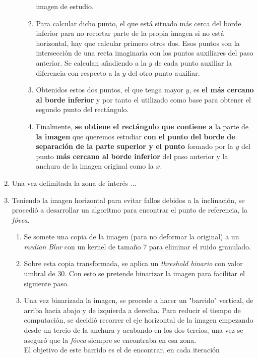 \begin{enumerate}
\begin{enumerate}[label*=\arabic*.]
\begin{enumerate}[label*=\arabic*.]
      imagen de estudio.
    \item Para calcular dicho punto, el que está situado más cerca del
      borde inferior para no recortar parte de la propia imagen si no
      está horizontal, hay que calcular primero otros dos. Esos puntos
      son la intersección de una recta imaginaria con los puntos
      auxiliares del paso anterior. Se calculan añadiendo a la $y$ de
      cada punto auxiliar la diferencia con respecto a la $y$ del otro
      punto auxiliar.
    \item Obtenidos estos dos puntos, el que tenga mayor $y$, es
      \textbf{el más cercano al borde inferior} y por tanto el
      utilizado como base para obtener el segundo punto del
      rectángulo.
    \item Finalmente, \textbf{se obtiene el rectángulo que contiene a}
      la parte de \textbf{la imagen} que queremos estudiar \textbf{con
        el punto del borde de separación de la parte superior y el
        punto} formado por la $y$ del punto \textbf{más cercano al
        borde inferior} del paso anterior y la anchura de la imagen
      original como la $x$.
    \end{enumerate}
  \end{enumerate}
\item Una vez delimitada la zona de interés ... %
\item Teniendo la imagen horizontal para evitar fallos debidos a la 
  inclinación, se procedió a desarrollar un algoritmo para encontrar 
  el punto de referencia, la \emph{fóvea}.
  \begin{enumerate}[label*=\arabic*.] 
  \item Se somete una copia de la imagen (para no deformar la original)
    a un \emph{median Blur} con un kernel de tamaño 7 para eliminar 
    el ruido granulado.
  \item Sobre esta copia transformada, se aplica un 
    \emph{threshold binario} con valor umbral de 30. Con esto se 
    pretende binarizar la imagen para facilitar el siguiente paso.
  \item Una vez binarizada la imagen, se procede a hacer un "barrido" 
    vertical, de arriba hacia abajo y de izquierda a derecha. Para 
    reducir el tiempo de computación, se decidió recorrer el eje 
    horizontal de la imagen empezando desde un tercio de la anchura y 
    acabando en los dos tercios, una vez se aseguró que la \emph{fóvea} 
    siempre se encontraba en esa zona. \\
    El objetivo de este barrido es el de encontrar, en cada iteración 

\end{enumerate}
\end{enumerate}
